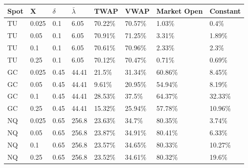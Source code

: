 \begin{tabular}{llllllll}
\toprule
Spot &     X & $\delta$ & $\bar{\lambda}$ &    TWAP &    VWAP & Market Open & Constant \\
\midrule
  TU & 0.025 &      0.1 &            6.05 & 70.22\% & 70.57\% &      1.03\% &    0.4\% \\
  TU &  0.05 &      0.1 &            6.05 & 70.91\% & 71.25\% &      3.31\% &   1.89\% \\
  TU &   0.1 &      0.1 &            6.05 & 70.61\% & 70.96\% &      2.33\% &    2.3\% \\
  TU &  0.25 &      0.1 &            6.05 & 70.12\% & 70.47\% &      0.71\% &   0.69\% \\
  GC & 0.025 &     0.45 &           44.41 &  21.5\% & 31.34\% &     60.86\% &   8.45\% \\
  GC &  0.05 &     0.45 &           44.41 &  9.61\% & 20.95\% &     54.94\% &   8.19\% \\
  GC &   0.1 &     0.45 &           44.41 & 28.53\% &  37.5\% &     64.37\% &  32.33\% \\
  GC &  0.25 &     0.45 &           44.41 & 15.32\% & 25.94\% &     57.78\% &  10.96\% \\
  NQ & 0.025 &     0.65 &           256.8 & 23.63\% &  34.7\% &     80.35\% &   3.74\% \\
  NQ &  0.05 &     0.65 &           256.8 & 23.87\% & 34.91\% &     80.41\% &   6.33\% \\
  NQ &   0.1 &     0.65 &           256.8 & 23.57\% & 34.65\% &     80.33\% &  10.27\% \\
  NQ &  0.25 &     0.65 &           256.8 & 23.52\% & 34.61\% &     80.32\% &   19.6\% \\
\bottomrule
\end{tabular}
